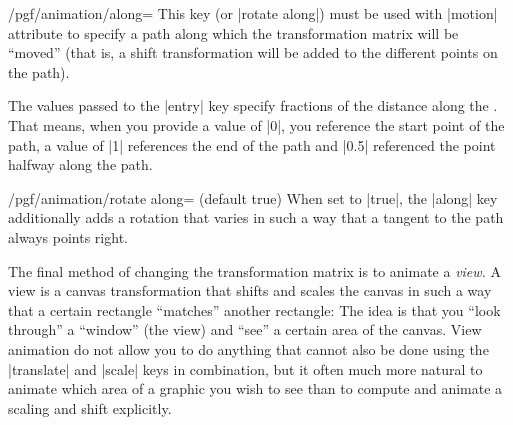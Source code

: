 \begin{key}{/pgf/animation/along=}
  This key (or |rotate along|) must be used with |motion| attribute to
  specify a path along which the transformation matrix will be
  ``moved'' (that is, a shift transformation will be added to the
  different points on the path).

  The values passed to the |entry| key specify fractions of the
  distance along the . That means, when you provide a value
  of |0|, you reference the start point of the path, a value of |1|
  references the end of the path and |0.5| referenced the point
  halfway along the path.

\begin{codeexample}[width=2.3cm]
\end{codeexample}
\end{key}

  
\begin{key}{/pgf/animation/rotate along= (default true)}
  When set to |true|, the |along| key additionally adds a rotation
  that varies in such a way that a tangent to the path always points right. 

\begin{codeexample}[width=2.3cm]
\end{codeexample}  
\end{key}

The final method of changing the transformation matrix is to animate 
a \emph{view.} A view is a canvas transformation that shifts and
scales the canvas in such a way that a certain rectangle ``matches''
another rectangle: The idea is that you ``look through'' a ``window''
(the view) and ``see'' a certain area of the canvas. View animation do
not allow you to do anything that cannot also be done using the
|translate| and |scale| keys in combination, but it often much more
natural to animate which area of a graphic you wish to see than to
compute and animate a scaling and shift explicitly.

